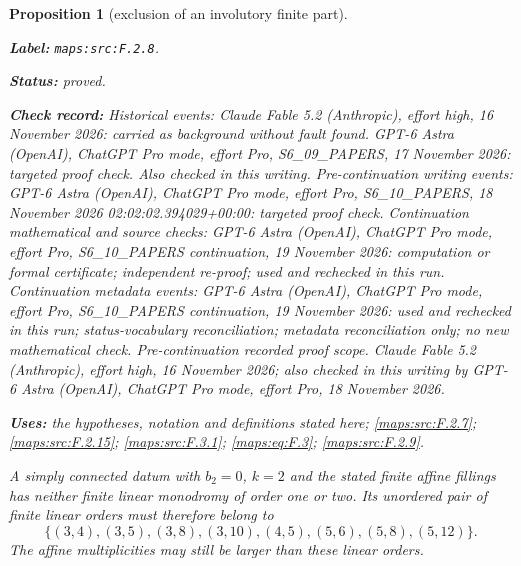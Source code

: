 \documentclass[11pt,a4paper]{article}
\newtheorem{proposition}[proposition]{Proposition}
\theoremstyle{definition}
\newcommand{\StatementRecord}[4]{\par\smallskip\begingroup\upshape\raggedright\noindent\textbf{Label:} \nolinkurl{#1}.\par\noindent\textbf{Status:} #2.\par\noindent\textbf{Check record:} #3.\par\noindent\textbf{Uses:} #4.\par\endgroup\smallskip}
\begin{document}
\begin{proposition}[exclusion of an involutory finite part]\label{maps:src:F.2.8}
\StatementRecord{maps:src:F.2.8}{proved}{Historical events: Claude Fable 5.2 (Anthropic), effort high, 16 November 2026: carried as background without fault found. GPT-6 Astra (OpenAI), ChatGPT Pro mode, effort Pro, S6\_09\_PAPERS, 17 November 2026: targeted proof check. Also checked in this writing. Pre-continuation writing events: GPT-6 Astra (OpenAI), ChatGPT Pro mode, effort Pro, S6\_10\_PAPERS, 18 November 2026 02:02:02.394029+00:00: targeted proof check. Continuation mathematical and source checks: GPT-6 Astra (OpenAI), ChatGPT Pro mode, effort Pro, S6\_10\_PAPERS continuation, 19 November 2026: computation or formal certificate; independent re-proof; used and rechecked in this run. Continuation metadata events: GPT-6 Astra (OpenAI), ChatGPT Pro mode, effort Pro, S6\_10\_PAPERS continuation, 19 November 2026: used and rechecked in this run; status-vocabulary reconciliation; metadata reconciliation only; no new mathematical check. \emph{Pre-continuation recorded proof scope.} Claude Fable 5.2 (Anthropic), effort high, 16 November 2026; also checked in this writing by GPT-6 Astra (OpenAI), ChatGPT Pro mode, effort Pro, 18 November 2026}{the hypotheses, notation and definitions stated here; \cref{maps:src:F.2.7}; \cref{maps:src:F.2.15}; \cref{maps:src:F.3.1}; \cref{maps:eq:F.3}; \cref{maps:src:F.2.9}}


A simply connected datum with $b_2=0$, $k=2$ and the stated
finite affine fillings has neither finite linear
monodromy of order one or two.  Its unordered pair of finite
linear orders must therefore belong to
\[
 \{(3,4),(3,5),(3,8),(3,10),(4,5),
       (5,6),(5,8),(5,12)\}.
 \tag{F.28}\label{maps:eq:F.28}
\]
The affine multiplicities may still be larger than these
linear orders.

\end{proposition}
\end{document}
